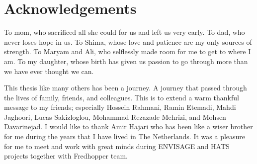 %
\chapter*{Acknowledgements}
\label{sec:acknowledgement}
\vspace*{-10mm}

To mom, who sacrificed all she could for us and left us very early.
To dad, who never loses hope in us.
To Shima, whose love and patience are my only sources of strength.
To Maryam and Ali, who selflessly made room for me to get to where I am.
To my daughter, whose birth has given us passion to go through more than 
we have ever thought we can.

This thesis like many others has been a journey.
A journey that passed through the lives of family, friends, and colleagues.
This is to extend a warm thankful message to my friends; especially
Hossein Rahmani, Ramin Etemadi, Mahdi Jaghoori, Lucas Sakizloglou,
Mohammad Rezazade Mehrizi, and Mohsen Davarinejad.
I would like to thank Amir Hajari who has been like a wiser brother 
for me during the years that I have lived in The Netherlands.
It was a pleasure for me to meet and work with great minds during
ENVISAGE and HATS projects together with Fredhopper team.
